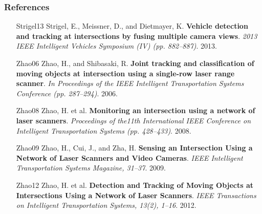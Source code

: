 \documentclass[table]{beamer}
\begin{document}
\frame
{
	\frametitle{References}
		\footnotesize{
	\begin{itemize}[leftmargin=.6in]
		\item [Strigel13] Strigel, E., Meissner, D., and Dietmayer, K. \textbf{Vehicle detection and tracking at intersections by fusing multiple camera views}. \textit{2013 IEEE Intelligent Vehicles Symposium (IV) (pp. 882–887)}. 2013.
		\item [Zhao06] Zhao, H., and Shibasaki, R. \textbf{Joint tracking and classification of moving objects at intersection using a single-row laser range scanner}. \textit{In Proceedings of the IEEE Intelligent Transportation Systems Conference (pp. 287–294)}. 2006.
		\item [Zhao08] Zhao, H. et al.\textbf{ Monitoring an intersection using a network of laser scanners}. \textit{Proceedings of the11th International IEEE Conference on Intelligent Transportation Systems (pp. 428–433)}. 2008.
		\item [Zhao09] Zhao, H., Cui, J., and Zha, H. \textbf{Sensing an Intersection Using a Network of Laser Scanners and Video Cameras}. \textit{IEEE Intelligent Transportation Systems Magazine, 31–37}. 2009.
		\item [Zhao12] Zhao, H. et al. \textbf{Detection and Tracking of Moving Objects at Intersections Using a Network of Laser Scanners}. \textit{IEEE Transactions on Intelligent Transportation Systems, 13(2), 1–16}. 2012.

	\end{itemize}	
	}
}

%
%

%
%
%

%
%
%
%
\end{document}
